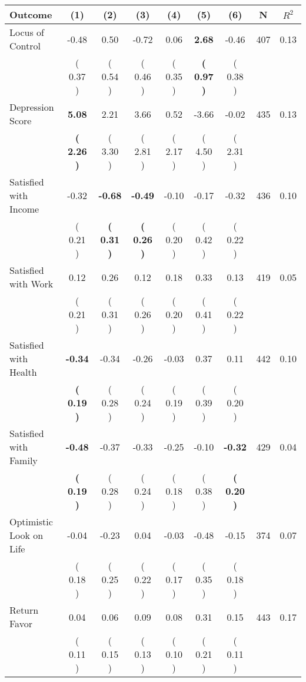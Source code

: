 \begin{tabular}{lcccccccc}
\toprule
 \textbf{Outcome} & \textbf{(1)} & \textbf{(2)} & \textbf{(3)} & \textbf{(4)} & \textbf{(5)} & \textbf{(6)} & \textbf{N} & \textbf{$ R^2$} \\
\midrule
Locus of Control &     -0.48 &      0.50 &     -0.72 &      0.06 & \textbf{     2.68} &     -0.46 & 407 &       0.13 \\ 
 & (     0.37 ) & (     0.54 ) & (     0.46 ) & (     0.35 ) & \textbf{(     0.97 )} & (     0.38 ) & \\
Depression Score & \textbf{     5.08} &      2.21 &      3.66 &      0.52 &     -3.66 &     -0.02 & 435 &       0.13 \\ 
 & \textbf{(     2.26 )} & (     3.30 ) & (     2.81 ) & (     2.17 ) & (     4.50 ) & (     2.31 ) & \\
Satisfied with Income &     -0.32 & \textbf{    -0.68} & \textbf{    -0.49} &     -0.10 &     -0.17 &     -0.32 & 436 &       0.10 \\ 
 & (     0.21 ) & \textbf{(     0.31 )} & \textbf{(     0.26 )} & (     0.20 ) & (     0.42 ) & (     0.22 ) & \\
Satisfied with Work &      0.12 &      0.26 &      0.12 &      0.18 &      0.33 &      0.13 & 419 &       0.05 \\ 
 & (     0.21 ) & (     0.31 ) & (     0.26 ) & (     0.20 ) & (     0.41 ) & (     0.22 ) & \\
Satisfied with Health & \textbf{    -0.34} &     -0.34 &     -0.26 &     -0.03 &      0.37 &      0.11 & 442 &       0.10 \\ 
 & \textbf{(     0.19 )} & (     0.28 ) & (     0.24 ) & (     0.19 ) & (     0.39 ) & (     0.20 ) & \\
Satisfied with Family & \textbf{    -0.48} &     -0.37 &     -0.33 &     -0.25 &     -0.10 & \textbf{    -0.32} & 429 &       0.04 \\ 
 & \textbf{(     0.19 )} & (     0.28 ) & (     0.24 ) & (     0.18 ) & (     0.38 ) & \textbf{(     0.20 )} & \\
Optimistic Look on Life &     -0.04 &     -0.23 &      0.04 &     -0.03 &     -0.48 &     -0.15 & 374 &       0.07 \\ 
 & (     0.18 ) & (     0.25 ) & (     0.22 ) & (     0.17 ) & (     0.35 ) & (     0.18 ) & \\
Return Favor &      0.04 &      0.06 &      0.09 &      0.08 &      0.31 &      0.15 & 443 &       0.17 \\ 
 & (     0.11 ) & (     0.15 ) & (     0.13 ) & (     0.10 ) & (     0.21 ) & (     0.11 ) & \\

\end{tabular}
